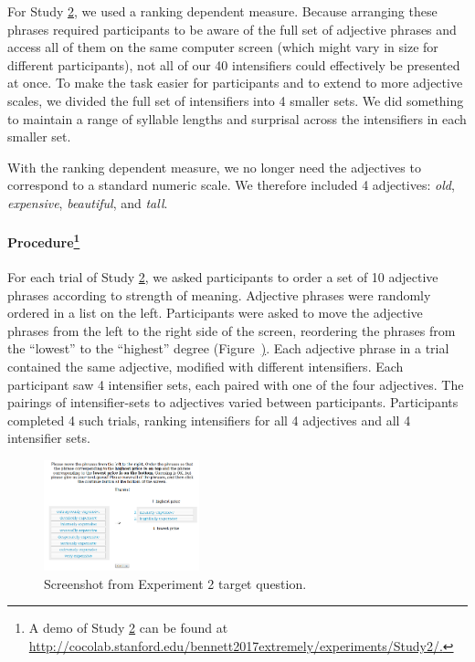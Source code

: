 \documentclass[10pt,letterpaper]{article}
\newcommand{\w}[1]{\emph{#1}}
\newcommand{\todo}[1]{{\color{red}#1}}
\begin{document}
For Study \hyperref[sec:study2]{2}, we used a ranking dependent measure.
Because arranging these phrases required participants to be aware of the full set of adjective phrases and access all of them on the same computer screen (which might vary in size for different participants), not all of our 40 intensifiers could effectively be presented at once.
To make the task easier for participants and to extend to more adjective scales, we divided the full set of intensifiers into 4 smaller sets. We \todo{did something} to maintain a range of syllable lengths and surprisal across the intensifiers in each smaller set.

With the ranking dependent measure, we no longer need the adjectives to correspond to a standard numeric scale.
We therefore included 4 adjectives: \w{old}, \w{expensive}, \w{beautiful}, and \w{tall}.

\paragraph{Procedure\footnote{A demo of Study \hyperref[sec:study2]{2} can be found at \url{http://cocolab.stanford.edu/bennett2017extremely/experiments/Study2/.}}}

For each trial of Study \hyperref[sec:study2]{2}, we asked participants to order a set of 10 adjective phrases according to strength of meaning.
Adjective phrases were randomly ordered in a list on the left.
Participants were asked to move the adjective phrases from the left to the right side of the screen, reordering the phrases from the ``lowest'' to the ``highest'' degree (Figure~\hyperref[fig:question_study2]).
Each adjective phrase in a trial contained the same adjective, modified with different intensifiers.
Each participant saw 4 intensifier sets, each paired with one of the four adjectives.
The pairings of intensifier-sets to adjectives varied between participants.
Participants completed 4 such trials, ranking intensifiers for all 4 adjectives and all 4 intensifier sets.

\begin{figure}[hbt]
\begin{center}
\includegraphics[width=0.4\textwidth]{exp2-q.png}
\end{center}
\caption{Screenshot from Experiment 2 target question.} 
\label{fig:question_study2}
\end{figure}
\end{document}
